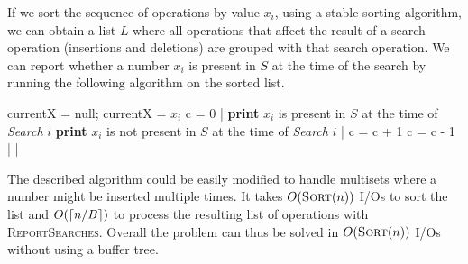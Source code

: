 If we sort the sequence of operations by value $x_i$, using a stable sorting algorithm, we can obtain a list $L$ where all operations that affect the result of a search operation (insertions and deletions) are grouped with that search operation. We can report whether a number $x_i$ is present in $S$ at the time of the search by running the following algorithm on the sorted list.
\begin{sourcecode}
currentX = null;
		currentX = $x_i$
		c = 0
	|
			\textbf{print} $x_i$ is present in $S$ at the time of \textit{Search} $i$
		\qelse
			\textbf{print} $x_i$ is not present in $S$ at the time of \textit{Search} $i$
		|
	\qelse {}
		c = c + 1
	\qelse {}
		c = c - 1
	|
|
\qend
\end{sourcecode}

The described algorithm could be easily modified to handle multisets where a number might be inserted multiple times. It takes $O(\textsc{Sort}(n))$ I/Os to sort the list and $O(\lceil n/B\rceil)$ to process the resulting list of operations with \textsc{ReportSearches}. Overall the problem can thus be solved in $O(\textsc{Sort}(n))$ I/Os without using a buffer tree.
